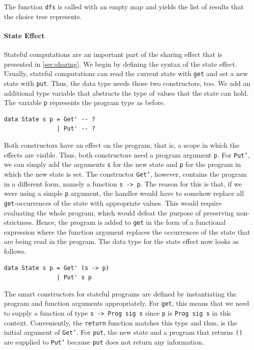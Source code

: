 \documentclass[a4paper, 11pt, fleqn, twoside]{scrreprt}
\newcommand{\todo}[1]{\marginpar{\textbf{TODO:} #1}}
\newcommand{\hinl}[1]{\texttt{#1}}
\begin{document}
The function \hinl{dfs} is called with an empty map and yields the list of results that the choice tree represents.
\todo{Examples}

\paragraph{State Effect}
Stateful computations are an important part of the sharing effect that is presented in \autoref{sec:sharing}.
We begin by defining the syntax of the state effect.
Usually, stateful computations can read the current state with \hinl{get} and set a new state with \hinl{put}.
Thus, the data type needs those two constructors, too.
We add an additional type variable that abstracts the type of values that the state can hold.
The variable \hinl{p} represents the program type as before.

\begin{verbatim}
data State s p = Get' -- ?
               | Put' -- ?
\end{verbatim}

Both constructors have an effect on the program, that is, a scope in which the effects are visible.
Thus, both constructors need a program argument \hinl{p}.
For \hinl{Put'}, we can simply add the arguments \hinl{s} for the new state and \hinl{p} for the program in which the new state is set.
The constructor \hinl{Get'}, however, contains the program in a different form, namely a function \hinl{s -> p}.
The reason for this is that, if we were using a simple \hinl{p} argument, the handler would have to somehow replace all \hinl{get}-occurrences of the state with appropriate values.
This would require evaluating the whole program, which would defeat the purpose of preserving non-strictness.
Hence, the program is added to \hinl{get} in the form of a functional expression where the function argument replaces the occurrences of the state that are being read in the program.
The data type for the state effect now looks as follows.

\begin{verbatim}
data State s p = Get' (s -> p)
               | Put' s p
\end{verbatim}

The smart constructors for stateful programs are defined by instantiating the program and function arguments appropriately.
For \hinl{get}, this means that we need to supply a function of type \hinl{s -> Prog sig s} since \hinl{p} is \hinl{Prog sig s} in this context.
Conveniently, the \hinl{return} function matches this type and thus, is the initial argument of \hinl{Get'}.
For \hinl{put}, the new state and a program that returns \hinl{()} are supplied to \hinl{Put'} because \hinl{put} does not return any information.
\end{document}
